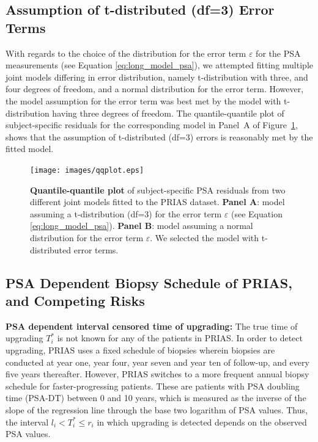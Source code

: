 \subsection{Assumption of t-distributed (df=3) Error Terms}
\label{subsec:t-dist-assumption}
With regards to the choice of the distribution for the error term $\varepsilon$ for the PSA measurements (see Equation \ref{eq:long_model_psa}), we attempted fitting multiple joint models differing in error distribution, namely t-distribution with three, and four degrees of freedom, and a normal distribution for the error term. However, the model assumption for the error term was best met by the model with t-distribution having three degrees of freedom. The quantile-quantile plot of subject-specific residuals for the corresponding model in Panel~A of Figure~\ref{fig:qqplot}, shows that the assumption of t-distributed (df=3) errors is reasonably met by the fitted model. 

\begin{figure}
\centerline{\texttt{[image: images/qqplot.eps]}}
\caption{\textbf{Quantile-quantile plot} of subject-specific PSA residuals from two different joint models fitted to the PRIAS dataset. \textbf{Panel A}: model assuming a t-distribution (df=3) for the error term $\varepsilon$ (see Equation \ref{eq:long_model_psa}). \textbf{Panel B}: model assuming a normal distribution for the error term $\varepsilon$. We selected the model with t-distributed error terms.}
\label{fig:qqplot}
\end{figure}

\clearpage
\subsection{PSA Dependent Biopsy Schedule of PRIAS, and Competing Risks}
\label{subsec:ascertainment_bias}
\textbf{PSA dependent interval censored time of upgrading:} The true time of upgrading $T^*_i$ is not known for any of the patients in PRIAS. In order to detect upgrading, PRIAS uses a fixed schedule of biopsies wherein biopsies are conducted at year one, year four, year seven and year ten of follow-up, and every five years thereafter. However, PRIAS switches to a more frequent annual biopsy schedule for faster-progressing patients. These are patients with PSA doubling time (PSA-DT) between 0 and 10 years, which is measured as the inverse of the slope of the regression line through the base two logarithm of PSA values. Thus, the interval $l_i < T_i^* \leq r_i$ in which upgrading is detected depends on the observed PSA values. 

